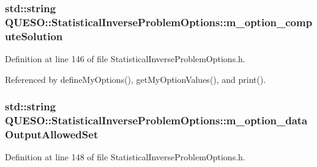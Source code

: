 \hypertarget{class_q_u_e_s_o_1_1_statistical_inverse_problem_options_ab6eeb26f8464cd104a9352774027aa7b}{
\subsubsection[{m\-\_\-option\-\_\-compute\-Solution}]{\setlength{\rightskip}{0pt plus 5cm}std\-::string Q\-U\-E\-S\-O\-::\-Statistical\-Inverse\-Problem\-Options\-::m\-\_\-option\-\_\-compute\-Solution\hspace{0.3cm}{\ttfamily [private]}}}\label{class_q_u_e_s_o_1_1_statistical_inverse_problem_options_ab6eeb26f8464cd104a9352774027aa7b}


Definition at line 146 of file Statistical\-Inverse\-Problem\-Options.\-h.



Referenced by define\-My\-Options(), get\-My\-Option\-Values(), and print().

\hypertarget{class_q_u_e_s_o_1_1_statistical_inverse_problem_options_ac88a78b03e97a655819b039ed6068bbd}{
\subsubsection[{m\-\_\-option\-\_\-data\-Output\-Allowed\-Set}]{\setlength{\rightskip}{0pt plus 5cm}std\-::string Q\-U\-E\-S\-O\-::\-Statistical\-Inverse\-Problem\-Options\-::m\-\_\-option\-\_\-data\-Output\-Allowed\-Set\hspace{0.3cm}{\ttfamily [private]}}}\label{class_q_u_e_s_o_1_1_statistical_inverse_problem_options_ac88a78b03e97a655819b039ed6068bbd}


Definition at line 148 of file Statistical\-Inverse\-Problem\-Options.\-h.



